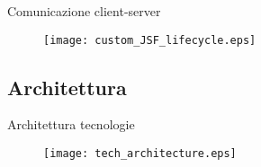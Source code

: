 \begin{frame}{Comunicazione client-server}

\begin{figure}
	\centering
	\texttt{[image: custom\_JSF\_lifecycle.eps]}
\end{figure}

\end{frame}


\subsection{Architettura}

\begin{frame}{Architettura tecnologie}
\begin{figure}
	\centering
	\texttt{[image: tech\_architecture.eps]}
\end{figure}
\end{frame}



